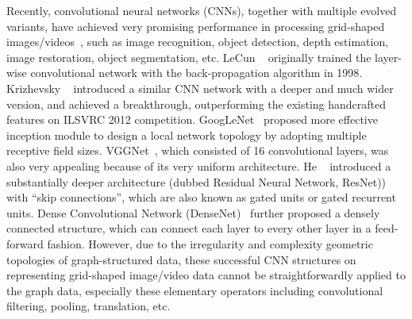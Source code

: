 \documentclass[journal]{IEEEtran}
\begin{document}
Recently, convolutional neural networks (CNNs), together with multiple evolved variants, have achieved very promising performance in processing grid-shaped images/videos~\cite{alexnet,vgg,densenet,resnet}, such as image recognition, object detection, depth estimation, image restoration, object segmentation, etc.
LeCun ~\cite{Lecun98} originally trained the layer-wise convolutional network with the back-propagation algorithm in 1998.
Krizhevsky ~\cite{alexnet} introduced a similar CNN network with a deeper and much wider version, and achieved a breakthrough, outperforming the existing handcrafted features on ILSVRC 2012 competition.
GoogLeNet~\cite{googleLeNet} proposed more effective inception module to design a local network topology by adopting multiple receptive field sizes.
VGGNet~\cite{vgg}, which consisted of 16 convolutional layers, was also very appealing because of its very uniform architecture.
He ~\cite{resnet} introduced a substantially deeper architecture (dubbed Residual Neural Network, ResNet)) with “skip connections”, which are also known as gated units or gated recurrent units.
Dense Convolutional Network (DenseNet)~\cite{densenet} further proposed a densely connected structure, which can connect each layer to every other layer in a feed-forward fashion.
However, due to the irregularity and complexity geometric topologies of graph-structured data, these successful CNN structures on representing grid-shaped image/video data cannot be straightforwardly applied to the graph data, especially these elementary operators including convolutional filtering, pooling, translation, etc.
\end{document}
